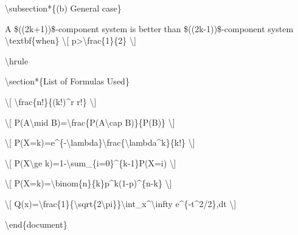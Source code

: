 \textbackslash subsection*\{(b) General case\}

A \$((2k+1))\$-component system is better than \$((2k-1))\$-component
system \textbackslash textbf\{when\} \textbackslash{[}
p\textgreater\textbackslash frac\{1\}\{2\} \textbackslash{]}

\textbackslash hrule

\textbackslash section*\{List of Formulas Used\}

\textbackslash{[} \textbackslash frac\{n!\}\{(k!)\^{}r r!\}
\textbackslash{]}

\textbackslash{[} P(A\textbackslash mid
B)=\textbackslash frac\{P(A\textbackslash cap B)\}\{P(B)\}
\textbackslash{]}

\textbackslash{[}
P(X=k)=e\^{}\{-\textbackslash lambda\}\textbackslash frac\{\textbackslash lambda\^{}k\}\{k!\}
\textbackslash{]}

\textbackslash{[} P(X\textbackslash ge
k)=1-\textbackslash sum\_\{i=0\}\^{}\{k-1\}P(X=i) \textbackslash{]}

\textbackslash{[}
P(X=k)=\textbackslash binom\{n\}\{k\}p\^{}k(1-p)\^{}\{n-k\}
\textbackslash{]}

\textbackslash{[}
Q(x)=\textbackslash frac\{1\}\{\textbackslash sqrt\{2\textbackslash pi\}\}\textbackslash int\_x\^{}\textbackslash infty
e\^{}\{-t\^{}2/2\},dt \textbackslash{]}

\textbackslash end\{document\}
